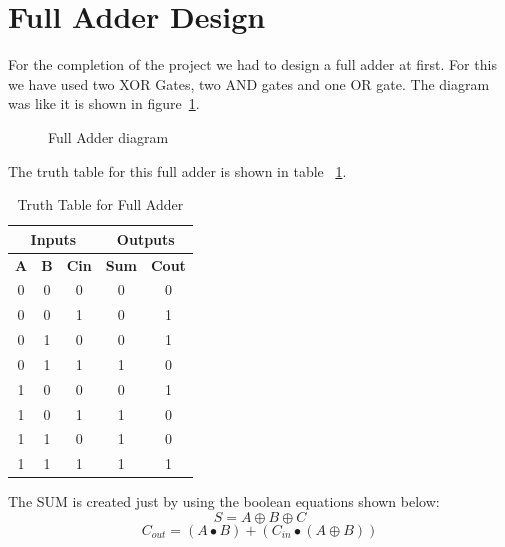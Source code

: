 \documentclass[a4paper, 12pt, twoside]{scrreprt}
\begin{document}
\section{Full Adder Design}
For the completion of the project we had to design a full adder at first. For this we have used two XOR Gates, two AND gates and one OR gate. The diagram was like it is shown in figure~\ref{Fa}.
\begin{center}
\begin{figure}[h]
\begin{center}
\end{center} 
\caption{Full Adder diagram \label{Fa}}
\end{figure}
\end{center}
The truth table for this full adder is shown in table ~\ref{ttFa}.
\begin{table}[h]
\centering
\caption{Truth Table for Full Adder}
\label{ttFa}
\begin{tabular}{|c|c|c|c|c|}
\hline
\multicolumn{3}{|c|}{\textbf{Inputs}}  & \multicolumn{2}{c|}{\textbf{Outputs}} \\ \hline
\textbf{A} & \textbf{B} & \textbf{Cin} & \textbf{Sum}      & \textbf{Cout}     \\ \hline
0          & 0          & 0            & 0                 & 0                 \\ \hline
0          & 0          & 1            & 0                 & 1                 \\ \hline
0          & 1          & 0            & 0                 & 1                 \\ \hline
0          & 1          & 1            & 1                 & 0                 \\ \hline
1          & 0          & 0            & 0                 & 1                 \\ \hline
1          & 0          & 1            & 1                 & 0                 \\ \hline
1          & 1          & 0            & 1                 & 0                 \\ \hline
1          & 1          & 1            & 1                 & 1                 \\ \hline
\end{tabular}
\end{table}
The SUM is created just by using the boolean equations shown below:
\[ S = A  \oplus  B  \oplus  C \]
\[ C_{out} = (A  \bullet B) + (C_{in}  \bullet (A  \oplus B)) \]
\clearpage
\end{document}
